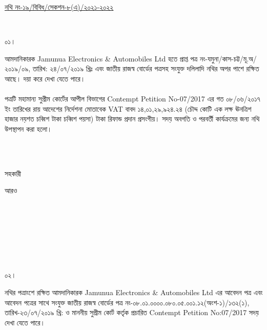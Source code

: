 \documentclass[12pt]{article}
\newcommand{\fileno}{নথি নং-১৯/বিবিধ/সেকশন-৮(এ)/২০২১-২০২২}
\newcommand{\nbrl}{নং-০৮.০১.০০০০.০৮০.০৫.০০১.১২(অংশ-১)/১৩২(১), তারিখ-২৩/০৭/২০১৯ খ্রি:}
\newcommand{\nbrl}{নং-০৮.০১.০০০০.০৮০.০৫.০০১.১২(অংশ-১)/১৩২(২), তারিখ-২৩/০৭/২০১৯ খ্রি:}
\newcommand{\nbrl}{নং-০৮.০১.০০০০.০৮০.০৫.০০১.১২(অংশ-১)/১৭২, তারিখ-১৭/১১/২০১৯ খ্রি:}
\newcommand{\tvat}{১৪,০১,২৯,৯২৪.২৪ (চৌদ্দ কোটি এক লক্ষ ঊনত্রিশ হাজার নয়শত চব্বিশ টাকা চব্বিশ পয়সা) টাকা}
\newcommand{\tvat}{২,১৩,৯৫,৯৪০.৩৩ (দু্ই কোটি তের লক্ষ পঁচানব্বই হাজার নয়শত চল্লিশ টাকা তেত্রিশ পয়সা) টাকা}
\begin{document}
\begin{minipage}[t]{0.59\linewidth}
\hspace{0.5em}
\end{minipage}
\begin{minipage}[t]{1\textwidth}
\underline{
{\fileno}
}
\end{minipage}
\\
\begin{minipage}[t]{0.05\linewidth}
০১।
\end{minipage}
\begin{minipage}[t]{1\linewidth}
আমদানিকারক
Jamunua Electronics \& Automobiles Ltd
হতে প্রাপ্ত
পত্র নং-যমুনা/কাস-চট্ট/মূ.অ/২০১৯/০৯,
তারিখ: ২৪/০৭/২০১৯ খ্রিঃ
এবং জাতীয় রাজস্ব বোর্ডের পত্রসহ সংযুক্ত
দলিলাদি নথির অপর পাশে রক্ষিত আছে।
দয়া করে দেখা যেতে পারে।
\\
\\
পত্রটি মহামান্য সুপ্রীম কোর্টের আপীল বিভাগের
Contempt Petition No-07/2017
এর গত ০৮/০৬/২০১৭ ইং তারিখের
রায় আদেশের নির্দেশনা মোতাবেক
VAT বাবদ
{\tvat} রিফান্ড প্রদান প্রসংগীয়।
সদয় অবগতি ও পরবর্তী কার্যক্রমের জন্য
নথি উপস্থাপন করা হলো।
\end{minipage}
\\
\\
\begin{minipage}[t]{0.05\linewidth}
\hspace{1em}
\end{minipage}
\begin{minipage}[t]{.5\linewidth}
সহকারী
\end{minipage}
\begin{minipage}[t]{1\linewidth}
আরও
\end{minipage}
\\
\\
\\
\\
\\
\\
\begin{minipage}[t]{0.05\linewidth}
০২।
\end{minipage}
\begin{minipage}[t]{1\linewidth}
নথির পত্রাংশে রক্ষিত আমদানিকারক
Jamunua Electronics \& Automobiles Ltd
এর আবেদন পত্র এবং আবেদন পত্রের সাথে সংযুক্ত
জাতীয় রাজস্ব বোর্ডের পত্র
{\nbrl} ও মাননীয় সুপ্রীম কোর্ট কর্তৃক প্রচারিত
Contempt Petition No:07/2017
সদয় দেখা যেতে পারে।
\end{minipage}
\\
\\
\\
\end{document}

